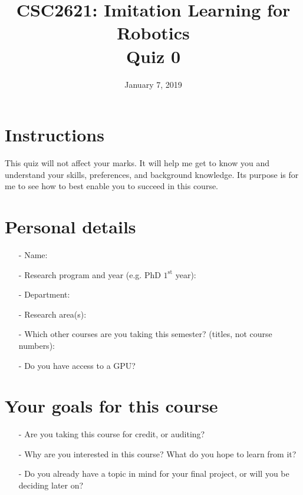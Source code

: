 \documentclass{article}
\title{CSC2621: Imitation Learning for Robotics \\ Quiz 0}
\date{January 7, 2019}
\begin{document}
\maketitle

\section{Instructions} This quiz will not affect your marks. It will help me get to know you and understand your skills, preferences, and background knowledge. Its purpose is for me to see how to best enable you to succeed in this course.
\newline

\section{Personal details}
\begin{itemize}
\item[-] Name:
\item[-] Research program and year (e.g. PhD $1^{\text{st}}$ year):
\item[-] Department:
\item[-] Research area(s):
\item[-] Which other courses are you taking this semester? (titles, not course numbers):
\item[-] Do you have access to a GPU?
\end{itemize}

\section{Your goals for this course}
\begin{itemize}
\item[-] Are you taking this course for credit, or auditing?
\item[-] Why are you interested in this course? What do you hope to learn from it?
\item[-] Do you already have a topic in mind for your final project, or will you be deciding later on?
\end{itemize}
\end{document}
